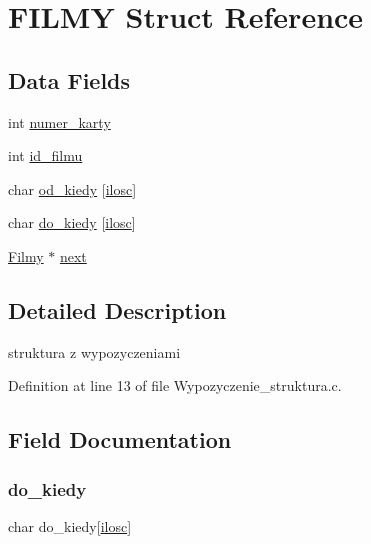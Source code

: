 \hypertarget{struct_f_i_l_m_y}{}\section{F\+I\+L\+MY Struct Reference}
\label{struct_f_i_l_m_y}
\subsection*{Data Fields}
\begin{DoxyCompactItemize}
\item 
int \hyperlink{struct_f_i_l_m_y_ac06e2ac007dc7c50c5b41b72a68c13c4}{numer\+\_\+karty}
\item 
int \hyperlink{struct_f_i_l_m_y_aecdfe8f01c61387a7582c4549735d270}{id\+\_\+filmu}
\item 
char \hyperlink{struct_f_i_l_m_y_ac1e0a7d2316abe4942bc38dcd2a48520}{od\+\_\+kiedy} \mbox{[}\hyperlink{_wypozyczenie__struktura_8c_a802c84452854799df868a4a660d3d58a}{ilosc}\mbox{]}
\item 
char \hyperlink{struct_f_i_l_m_y_aa9b23d055b47a7c67f52da58f9429efd}{do\+\_\+kiedy} \mbox{[}\hyperlink{_wypozyczenie__struktura_8c_a802c84452854799df868a4a660d3d58a}{ilosc}\mbox{]}
\item 
\hyperlink{_wypozyczenie__struktura_8c_aedefc373cfe2ed0d3900e3eeae23e46c}{Filmy} $\ast$ \hyperlink{struct_f_i_l_m_y_aa03a81bcff76f1e4a34c0f7cf2dd5241}{next}
\end{DoxyCompactItemize}


\subsection{Detailed Description}
struktura z wypozyczeniami 

Definition at line 13 of file Wypozyczenie\+\_\+struktura.\+c.



\subsection{Field Documentation}
\mbox{\label{struct_f_i_l_m_y_aa9b23d055b47a7c67f52da58f9429efd}} 
\subsubsection{\texorpdfstring{do\+\_\+kiedy}{do\_kiedy}}
{\footnotesize\ttfamily char do\+\_\+kiedy\mbox{[}\hyperlink{_wypozyczenie__struktura_8c_a802c84452854799df868a4a660d3d58a}{ilosc}\mbox{]}}



